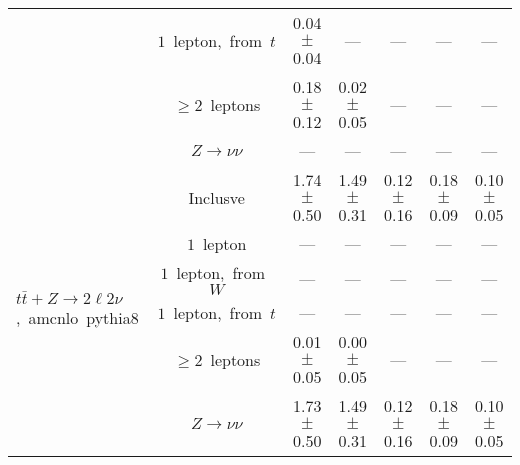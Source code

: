 \documentclass{article}
\begin{document}
\begin{longtable}{|l|c|c|c|c|c|c|}
 & $1$~lepton,~from~$t$  & 0.04 $\pm$ 0.04  & ---  & ---  & ---  & --- \\* 
 & $\ge2$~leptons  & 0.18 $\pm$ 0.12  & 0.02 $\pm$ 0.05  & ---  & ---  & --- \\* 
 & $Z\rightarrow\nu\nu$  & ---  & ---  & ---  & ---  & --- \\* 
\hline 
\multirow{6}{*}{$t\bar{t}+Z{\rightarrow}2{\ell}2{\nu}$,~amcnlo~pythia8} & Inclusve  & 1.74 $\pm$ 0.50  & 1.49 $\pm$ 0.31  & 0.12 $\pm$ 0.16  & 0.18 $\pm$ 0.09  & 0.10 $\pm$ 0.05 \\* 
 & $1$~lepton  & ---  & ---  & ---  & ---  & --- \\* 
 & $1$~lepton,~from~$W$  & ---  & ---  & ---  & ---  & --- \\* 
 & $1$~lepton,~from~$t$  & ---  & ---  & ---  & ---  & --- \\* 
 & $\ge2$~leptons  & 0.01 $\pm$ 0.05  & 0.00 $\pm$ 0.05  & ---  & ---  & --- \\* 
 & $Z\rightarrow\nu\nu$  & 1.73 $\pm$ 0.50  & 1.49 $\pm$ 0.31  & 0.12 $\pm$ 0.16  & 0.18 $\pm$ 0.09  & 0.10 $\pm$ 0.05 \\* 
\hline 
\end{longtable} 

 
 
 
 
\pagebreak 

 
 
 
 
\end{document}
